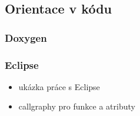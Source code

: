 \subsection{Orientace v kódu}

\begin{frame}
	\frametitle{Doxygen}
	\begin{itemize}
		\item{ukázka výstupu doxygenu pro Torque}
		\item{\url{http://files.simontoth.cz/doxydoc.tbz}
	\end{itemize}
\end{frame}

\begin{frame}
	\frametitle{Eclipse}
	\begin{itemize}
		\item{ukázka práce s Eclipse}
		\item{callgraphy pro funkce a atributy}
	\end{itemize}
\end{frame}




